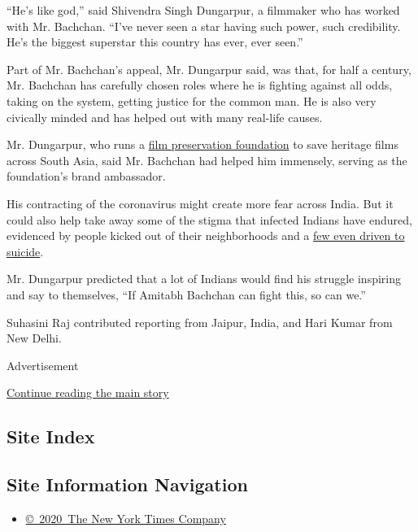 ``He's like god,'' said Shivendra Singh Dungarpur, a filmmaker who has
worked with Mr. Bachchan. ``I've never seen a star having such power,
such credibility. He's the biggest superstar this country has ever, ever
seen.''

Part of Mr. Bachchan's appeal, Mr. Dungarpur said, was that, for half a
century, Mr. Bachchan has carefully chosen roles where he is fighting
against all odds, taking on the system, getting justice for the common
man. He is also very civically minded and has helped out with many
real-life causes.

Mr. Dungarpur, who runs a
\href{https://filmheritagefoundation.co.in/}{film preservation
foundation} to save heritage films across South Asia, said Mr. Bachchan
had helped him immensely, serving as the foundation's brand ambassador.

His contracting of the coronavirus might create more fear across India.
But it could also help take away some of the stigma that infected
Indians have endured, evidenced by people kicked out of their
neighborhoods and a
\href{https://www.livemint.com/news/india/illness-triggers-social-stigma-and-suicide-in-southern-tamil-nadu-11586884992752.html}{few
even driven to suicide}.

Mr. Dungarpur predicted that a lot of Indians would find his struggle
inspiring and say to themselves, ``If Amitabh Bachchan can fight this,
so can we.''

Suhasini Raj contributed reporting from Jaipur, India, and Hari Kumar
from New Delhi.

Advertisement

\protect\hyperlink{after-bottom}{Continue reading the main story}

\hypertarget{site-index}{%
\subsection{Site Index}\label{site-index}}

\hypertarget{site-information-navigation}{%
\subsection{Site Information
Navigation}\label{site-information-navigation}}

\begin{itemize}
\tightlist
\item
  \href{https://help.nytimes.com/hc/en-us/articles/115014792127-Copyright-notice}{©~2020~The
  New York Times Company}
\end{itemize}

